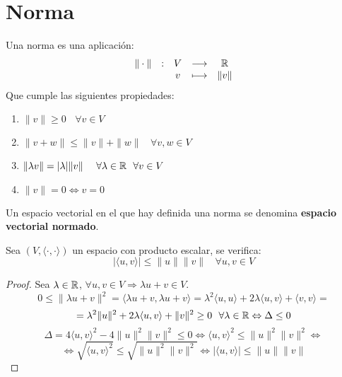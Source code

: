 \section{Norma}
\begin{definicion}[Norma]
    Una norma es una aplicación:
    $$\begin{array}{ccccc}
            \|\cdot\| & : & V & \longrightarrow & \mathbb R    \\
                      &   & v & \longmapsto     & \|v\|
        \end{array}$$
    Que cumple las siguientes propiedades:
    \begin{enumerate}
        \item $\|v\| \geq 0~~~~\forall v \in V$
        \item $\|v+w\| \leq \|v\|+\|w\|~~~~\forall v,w \in V$
        \item $\|\lambda v\| = |\lambda| \|v\|~~~~\forall \lambda \in \mathbb R~~\forall v \in V$
        \item $\|v\|=0 \Leftrightarrow v=0$
    \end{enumerate}

    \noindent
    Un espacio vectorial en el que hay definida una norma se denomina \textbf{espacio vectorial normado}.
\end{definicion}

\begin{teo}
    Sea $(V, \langle \cdot , \cdot \rangle)$ un espacio con producto escalar, se verifica:
    $$|\langle u,v \rangle| \leq \|u\|\|v\|~~~~\forall u,v \in V$$
\end{teo}
\begin{proof}
    Sea $\lambda \in \mathbb R$, $\forall u,v \in V \Rightarrow \lambda u + v \in V$.
    $$0 \leq \|\lambda u + v\|^2 = \langle \lambda u + v, \lambda u + v \rangle = \lambda^2 \langle u,u \rangle + 2\lambda
        \langle u,v \rangle + \langle v,v \rangle=$$
    $$= \lambda^2 \|u\|^2 + 2\lambda \langle u,v \rangle + \|v\|^2 \geq 0 ~~\forall \lambda \in \mathbb R \Leftrightarrow \Delta \leq 0 $$
    $$\Delta = 4\langle u,v \rangle^2 - 4\|u\|^2 \|v\|^2 \leq 0 \Leftrightarrow \langle u,v \rangle^2 \leq \|u\|^2\|v\|^2 \Leftrightarrow$$
    $$\Leftrightarrow \sqrt{\langle u,v \rangle^2} \leq \sqrt{\|u\|^2\|v\|^2} \Leftrightarrow |\langle u,v \rangle| \leq \|u\|\|v\|$$
\end{proof}

